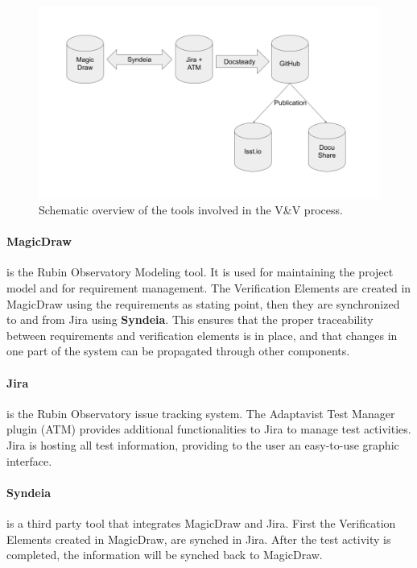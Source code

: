 \begin{figure}
\begin{center}
\includegraphics[width=\textwidth]{imgs/VandVtools.png}
 \caption{Schematic overview of the tools involved in the V\&V process.}
 \label{fig:vandvtools}
\end{center}
\end{figure}

\paragraph{MagicDraw}
is the Rubin Observatory Modeling tool. It is used for maintaining the project model and for requirement management. 
The Verification Elements are created in MagicDraw using the requirements as stating point, 
then they are synchronized to and from Jira using \textbf{Syndeia}. 
This ensures that the proper traceability between requirements and verification elements is in place, 
and that changes in one part of the system can be propagated through other components.

\paragraph{Jira}
is the Rubin Observatory issue tracking system.
The Adaptavist Test Manager plugin (ATM) provides additional functionalities to Jira to manage test activities.
Jira is hosting all test information, providing to the user an easy-to-use graphic interface.

\paragraph{Syndeia}
is a third party tool that integrates MagicDraw and Jira. First the Verification Elements created in MagicDraw,
are synched in Jira. After the test activity is completed, the information will be synched back to MagicDraw.

